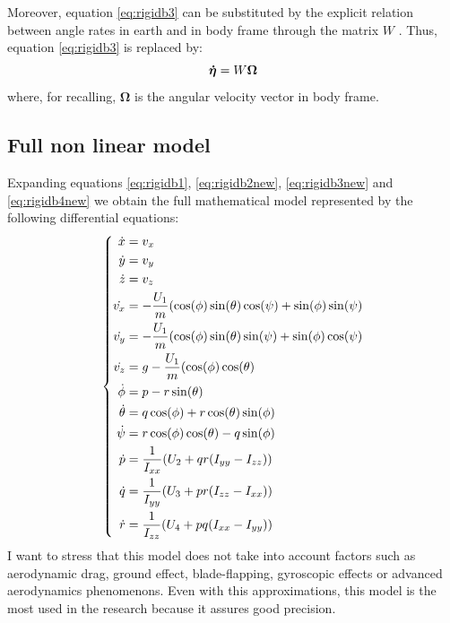 \noindent
Moreover, equation \eqref{eq:rigidb3} can be substituted by the explicit relation between angle rates in earth and in body frame through the matrix $W$ \cite{Kendoul2007}. Thus, equation \eqref{eq:rigidb3} is replaced by:
\vspace{1ex}
\begin{equation}
\vspace{1ex}
\boldsymbol{\dot{\eta}} = W\boldsymbol{\Omega}
\label{eq:rigidb3new}
\end{equation}
where, for recalling, $\boldsymbol{\Omega}$ is the angular velocity vector in body frame.

\subsection*{Full non linear model}
Expanding equations \eqref{eq:rigidb1}, \eqref{eq:rigidb2new}, \eqref{eq:rigidb3new} and \eqref{eq:rigidb4new} we obtain the full mathematical model represented by the following differential equations:
\vspace{2ex}
\begin{equation}
\vspace{2ex}
\left\lbrace
	\begin{aligned}
		\dot{x}& = v_x \\
		\dot{y}& = v_y \\
		\dot{z}& = v_z \\
		\dot{v_x}& = -\frac{U_1}{m}(\cos(\phi)\sin(\theta)\cos(\psi) + \sin(\phi)\sin(\psi) \\
		\dot{v_y}& = -\frac{U_1}{m}(\cos(\phi)\sin(\theta)\sin(\psi) + \sin(\phi)\cos(\psi) \\
		\dot{v_z}& = g - \frac{U_1}{m}(\cos(\phi)\cos(\theta) \\
        \dot{\phi}& = p - r \sin(\theta) \\
        \dot{\theta}& = q \cos(\phi) + r\cos(\theta) \sin(\phi) \\
        \dot{\psi}& = r \cos(\phi) \cos(\theta) - q \sin(\phi)\\
        \dot{p}& =\frac{1}{I_{xx}}(U_2 + qr(I_{yy} - I_{zz})) \\
        \dot{q}& =\frac{1}{I_{yy}}(U_3 + pr(I_{zz} - I_{xx})) \\
        \dot{r}& =\frac{1}{I_{zz}}(U_4 + pq(I_{xx} - I_{yy})) \\
     \end{aligned}
     \right.
\label{eq:mathfullmodel}
\end{equation}
I want to stress that this model does not take into account factors such as aerodynamic drag, ground effect, blade-flapping, gyroscopic effects or advanced aerodynamics phenomenons. Even with this approximations, this model is the most used in the research because it assures good precision.

